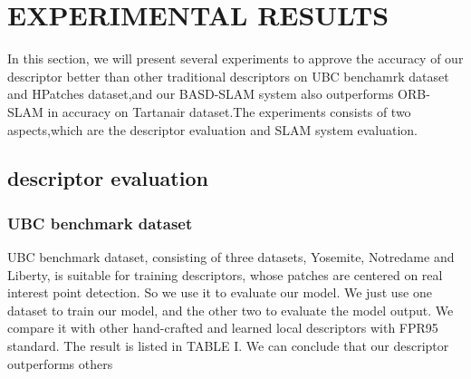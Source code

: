 \documentclass[conference]{IEEEtran}
\begin{document}
\section{EXPERIMENTAL RESULTS}
In this section, we will present several experiments to approve the accuracy of our descriptor better than other traditional descriptors on UBC benchamrk dataset and HPatches dataset,and our BASD-SLAM system also outperforms ORB-SLAM in accuracy on Tartanair dataset.The experiments consists of two aspects,which are the descriptor evaluation and SLAM system evaluation.

\subsection{descriptor evaluation}

\subsubsection{UBC benchmark dataset}
UBC benchmark dataset\cite{c29}, consisting of three datasets, Yosemite, Notredame and Liberty, is suitable for training descriptors, whose patches are centered on real interest point detection. So we use it to evaluate our model. We just use one dataset to train our model, and the other two to evaluate the model output. We compare it with other hand-crafted and learned local descriptors with FPR95 standard. The result is listed in TABLE I. We can conclude that our descriptor outperforms others
\end{document}

